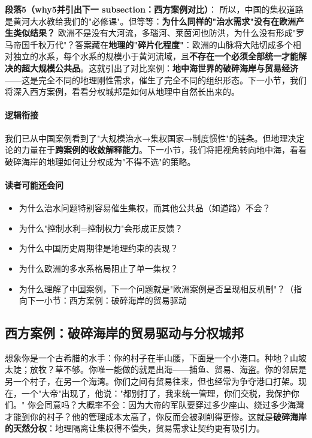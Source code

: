 \documentclass[../main.tex]{subfiles}
\begin{document}
	\textbf{段落5（why5并引出下一 subsection：西方案例对比）}：  
	所以，中国的集权道路是黄河大水教给我们的"必修课"。但等等：\textbf{为什么同样的"治水需求"没有在欧洲产生类似结果？} 欧洲不是没有大河流，多瑙河、莱茵河也防洪，为什么没有形成"罗马帝国千秋万代"？答案藏在\textbf{地理的"碎片化程度"}：欧洲的山脉将大陆切成多个相对独立的水系，每个水系的规模小于黄河流域，且\textbf{不存在一个必须全部统一才能解决的超大规模公共品}。这就引出了对比案例：\textbf{地中海世界的破碎海岸与贸易经济}——这是完全不同的地理刚性需求，催生了完全不同的组织形态。下一小节，我们将深入西方案例，看看分权城邦是如何从地理中自然长出来的。
	
	\paragraph*{逻辑衔接}
	我们已从中国案例看到了"大规模治水→集权国家→制度惯性"的链条。但地理决定论的力量在于\textbf{跨案例的收敛解释能力}。下一小节，我们将把视角转向地中海，看看破碎海岸的地理如何让分权成为"不得不选"的策略。
	
	\paragraph*{读者可能还会问}
	\begin{itemize}
\item 为什么治水问题特别容易催生集权，而其他公共品（如道路）不会？
	\item 为什么"控制水利=控制权力"会形成正反馈？
	\item 为什么中国历史周期律是地理约束的表现？
	\item 为什么欧洲的多水系格局阻止了单一集权？
	\item 为什么理解了中国案例，下一个问题就是"欧洲案例是否呈现相反机制"？（指向下一小节：西方案例：破碎海岸的贸易驱动
\end{itemize}
	
	\subsection{西方案例：破碎海岸的贸易驱动与分权城邦}
	
	\begin{motivation}
		想象你是一个古希腊的水手：你的村子在半山腰，下面是一个小港口。种地？山坡太陡；放牧？草不够。你唯一能做的就是出海——捕鱼、贸易、海盗。你的邻居是另一个村子，在另一个海湾。你们之间有贸易往来，但也经常为争夺港口打架。现在，一个"大帝"出现了，他说："都别打了，我来统一管理，你们交税，我保护你们。" 你会同意吗？大概率不会：因为大帝的军队要穿过多少座山、绕过多少海灣才能到你的村子？他的管理成本太高了，你反而会被剥削得更惨。这就是\textbf{破碎海岸的天然分权}：地理隔离让集权得不偿失，贸易需求让契约更有吸引力。
	\end{motivation}
	
\end{document}
